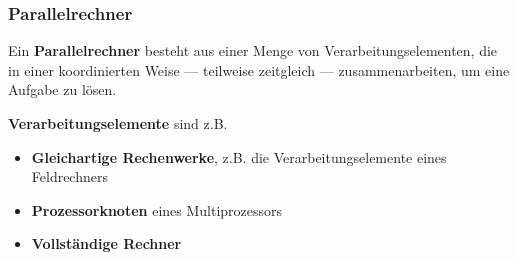 \documentclass[12pt,A4]{extarticle}
\newcommand{\highlight}[1]{\textcolor{highlightColor}{\textbf{#1}}}
\begin{document}
\subsubsection{Parallelrechner}
Ein \highlight{Parallelrechner} besteht aus einer Menge von Verarbeitungselementen, die in einer koordinierten Weise — teilweise zeitgleich — zusammenarbeiten, um eine Aufgabe zu lösen.\par
\textbf{Verarbeitungselemente} sind z.B.
\begin{itemize}
    \item{\textbf{Gleichartige Rechenwerke}, z.B. die Verarbeitungselemente eines Feldrechners}
    \item{\textbf{Prozessorknoten} eines Multiprozessors}
    \item{\textbf{Vollständige Rechner}}
\end{itemize}
\end{document}
